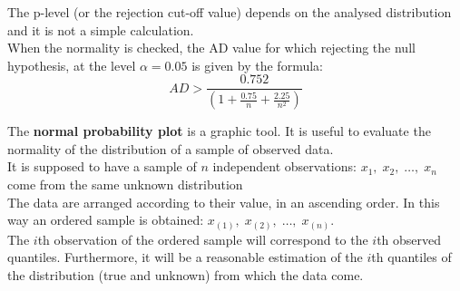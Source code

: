 \begin{frame}
  \vspace*{.25cm}
  The p-level (or the rejection cut-off value) depends on the analysed distribution and it is not a simple calculation.\\
  \vspace*{.75cm}
  When the normality is checked, the AD value for which rejecting the null hypothesis, at the level $ \alpha=0.05 $ is given by the formula:\\
  \vspace*{.5cm}
  $$ AD > \frac{0.752}{(1 + \frac{0.75}{n} + \frac{2.25}{n^2})} $$
\end{frame}


\begin{frame}
  \vspace*{.25cm}
  The \textbf{normal probability plot} is a graphic tool. It is useful to evaluate the normality of the distribution of a sample of observed data.\\
  \vspace*{.35cm}
  It is supposed to have a sample of $ n $ independent observations: $ x_1, \; x_2, \; \dots, \; x_n $ come from the same unknown distribution\\
  \vspace*{.35cm}
  The data are arranged according to their value, in an ascending order. In this way an ordered sample is obtained: $ x_{(1)}, \; x_{(2)}, \; \dots, \; x_{(n)} $.\\
  \vspace*{.35cm}
  The $ i $th observation of the ordered sample will correspond to the $ i $th  observed quantiles. Furthermore, it will be a reasonable estimation of the $ i $th quantiles of the distribution (true and unknown) from which the data come.
\end{frame}

